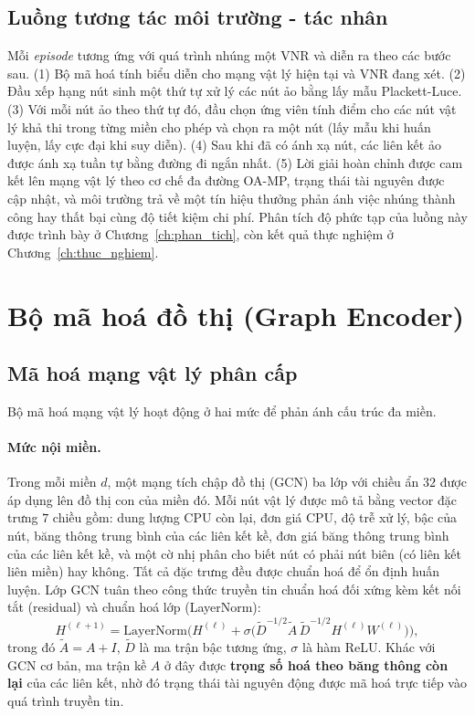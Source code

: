 \documentclass[../DoAn.tex]{subfiles}
\begin{document}
\subsection{Luồng tương tác môi trường - tác nhân}
\label{subsec:interaction}

Mỗi \textit{episode} tương ứng với quá trình nhúng một VNR và diễn ra theo các bước sau. (1) Bộ mã hoá tính biểu diễn cho mạng vật lý hiện tại và VNR đang xét. (2) Đầu xếp hạng nút sinh một thứ tự xử lý các nút ảo bằng lấy mẫu Plackett-Luce. (3) Với mỗi nút ảo theo thứ tự đó, đầu chọn ứng viên tính điểm cho các nút vật lý khả thi trong từng miền cho phép và chọn ra một nút (lấy mẫu khi huấn luyện, lấy cực đại khi suy diễn). (4) Sau khi đã có ánh xạ nút, các liên kết ảo được ánh xạ tuần tự bằng đường đi ngắn nhất. (5) Lời giải hoàn chỉnh được cam kết lên mạng vật lý theo cơ chế đa đường OA-MP, trạng thái tài nguyên được cập nhật, và môi trường trả về một tín hiệu thưởng phản ánh việc nhúng thành công hay thất bại cùng độ tiết kiệm chi phí. Phân tích độ phức tạp của luồng này được trình bày ở Chương~\ref{ch:phan_tich}, còn kết quả thực nghiệm ở Chương~\ref{ch:thuc_nghiem}.

\section{Bộ mã hoá đồ thị (Graph Encoder)}     %
\label{sec:encoder}

\subsection{Mã hoá mạng vật lý phân cấp}
\label{subsec:enc-substrate}

Bộ mã hoá mạng vật lý hoạt động ở hai mức để phản ánh cấu trúc đa miền.

\paragraph{Mức nội miền.} Trong mỗi miền $d$, một mạng tích chập đồ thị (GCN) ba lớp với chiều ẩn $32$ được áp dụng lên đồ thị con của miền đó. Mỗi nút vật lý được mô tả bằng vector đặc trưng $7$ chiều gồm: dung lượng CPU còn lại, đơn giá CPU, độ trễ xử lý, bậc của nút, băng thông trung bình của các liên kết kề, đơn giá băng thông trung bình của các liên kết kề, và một cờ nhị phân cho biết nút có phải nút biên (có liên kết liên miền) hay không. Tất cả đặc trưng đều được chuẩn hoá để ổn định huấn luyện. Lớp GCN tuân theo công thức truyền tin chuẩn hoá đối xứng kèm kết nối tắt (residual) và chuẩn hoá lớp (LayerNorm):
\begin{equation}
    H^{(\ell+1)} = \mathrm{LayerNorm}\!\Big( H^{(\ell)} + \sigma\big( \tilde{D}^{-1/2}\tilde{A}\,\tilde{D}^{-1/2} H^{(\ell)} W^{(\ell)} \big) \Big),
    \label{eq:gcn-layer}
\end{equation}
trong đó $\tilde{A}=A+I$, $\tilde{D}$ là ma trận bậc tương ứng, $\sigma$ là hàm ReLU. Khác với GCN cơ bản, ma trận kề $A$ ở đây được \textbf{trọng số hoá theo băng thông còn lại} của các liên kết, nhờ đó trạng thái tài nguyên động được mã hoá trực tiếp vào quá trình truyền tin.
\end{document}
